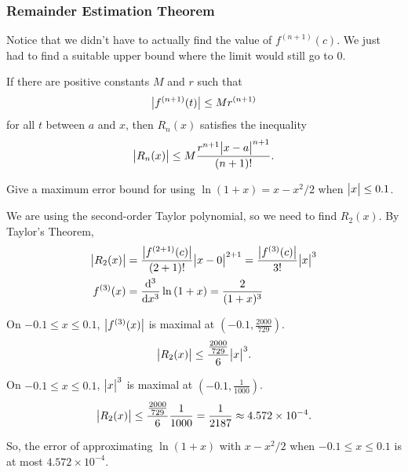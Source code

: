 \subsubsection{Remainder Estimation Theorem}
Notice that we didn't have to actually find the value of $f^{(n+1)}(c)$.
We just had to find a suitable upper bound where the limit would still go to 0.
\begin{theorem}
	If there are positive constants $M$ and $r$ such that
	\begin{equation*}
		\big\lvert f^{(n+1)}(t) \big\rvert \leq Mr^{(n+1)}
	\end{equation*}
	for all $t$ between $a$ and $x$, then $R_n(x)$ satisfies the inequality
	\begin{equation*}
		\big\lvert R_n(x) \big\rvert \leq M\frac{r^{n+1}\big\lvert x-a \big\rvert^{n+1}}{(n+1)!}.
	\end{equation*}
\end{theorem}

\begin{example}
	Give a maximum error bound for using $\ln{(1+x)} = x - x^2/2$ when $\big\lvert x \big\rvert \leq 0.1$.
\end{example}
\begin{answer}
	We are using the second-order Taylor polynomial, so we need to find $R_2(x)$.
	By Taylor's Theorem,
	\begin{align*}
		\big\lvert R_2(x) \big\rvert &= \frac{\big\lvert f^{(2+1)}(c) \big\rvert}{(2+1)!}\big\lvert x-0 \big\rvert^{2+1}  = \frac{\big\lvert f^{(3)}(c) \big\rvert}{3!}\big\lvert x \big\rvert^3\\
		f^{(3)}(x) &= \frac{\mathrm{d} ^3}{\mathrm{d} x^3}\ln{(1+x)} = \frac{2}{(1+x)^3} \\
	\end{align*}
	
	On $-0.1 \leq x \leq 0.1$, $\big\lvert f^{(3)}(x) \big\rvert$ is maximal at $(-0.1, \frac{2000}{729})$.
	\begin{equation*}
		\big\lvert R_2(x) \big\rvert \leq \frac{\frac{2000}{729}}{6}\big\lvert x \big\rvert^3.
	\end{equation*}
	
	On $-0.1 \leq x \leq 0.1$, $\big\lvert x \big\rvert^3$ is maximal at $(-0.1, \frac{1}{1000})$.
	\begin{equation*}
		\big\lvert R_2(x) \big\rvert \leq \frac{\frac{2000}{729}}{6}\frac{1}{1000} = \frac{1}{2187} \approx 4.572 \times 10^{-4}.
	\end{equation*}
	
	So, the error of approximating $\ln{(1+x)}$ with $x-x^2/2$ when $-0.1 \leq x \leq 0.1$ is at most $4.572 \times 10^{-4}$.
\end{answer}